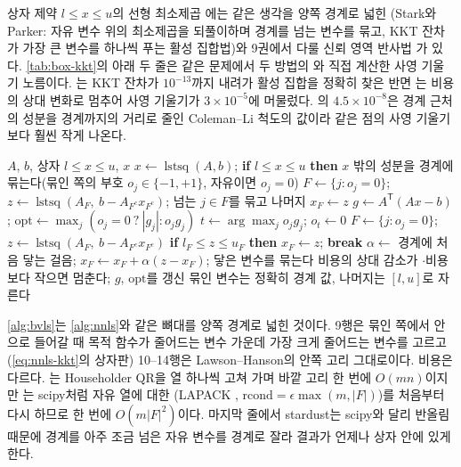 상자 제약 $l\le x\le u$의 선형 최소제곱 에는 같은 생각을 양쪽 경계로 넓힌 (Stark와 Parker\cite{stark1995}: 자유 변수 위의 최소제곱을 되풀이하며 경계를 넘는 변수를 묶고, KKT 잔차가 가장 큰 변수를 하나씩 푸는 활성 집합법)와 9권에서 다룰 신뢰 영역 반사법 가 있다. \cref{tab:box-kkt}의 아래 두 줄은 같은 문제에서 두 방법의 와 직접 계산한 사영 기울기 노름이다. 는 KKT 잔차가 $10^{-13}$까지 내려가 활성 집합을 정확히 찾은 반면 는 비용의 상대 변화로 멈추어 사영 기울기가 $3\times10^{-5}$에 머물렀다. 의  $4.5\times10^{-8}$은 경계 근처의 성분을 경계까지의 거리로 줄인 Coleman--Li 척도의 값이라 같은 점의 사영 기울기보다 훨씬 작게 나온다.

\begin{algorithm}[htbp]
\begin{algorithmic}[1]
\Require $A$, $b$, 상자 $l\le x\le u$, 
\Ensure $x$
\State $x\gets\operatorname{lstsq}(A,b)$; \textbf{if} $l\le x\le u$ \textbf{then} \Return $x$ 
\State 밖의 성분을 경계에 묶는다(묶인 쪽의 부호 $o_j\in\{-1,+1\}$, 자유이면 $o_j=0$)
\Repeat {}
  \State $F\gets\{j:o_j=0\}$; $z\gets\operatorname{lstsq}(A_F,\ b-A_{F^c}x_{F^c})$; 넘는 $j\in F$를 묶고 나머지 $x_F\gets z$
\State $g\gets A^{\mathsf T}(Ax-b)$; $\mathrm{opt}\gets\max_j(o_j=0\ ?\ |g_j|:o_jg_j)$
  \State $t\gets\arg\max_jo_jg_j$; $o_t\gets0$ 
  \Loop
    \State $F\gets\{j:o_j=0\}$; $z\gets\operatorname{lstsq}(A_F,\ b-A_{F^c}x_{F^c})$
    \State \textbf{if} $l_F\le z\le u_F$ \textbf{then} $x_F\gets z$; \textbf{break}
    \State $\alpha\gets$ 경계에 처음 닿는 걸음; $x_F\gets x_F+\alpha(z-x_F)$; 닿은 변수를 묶는다
  \EndLoop
  \State 비용의 상대 감소가 $\cdot$비용보다 작으면 멈춘다; $g$, $\mathrm{opt}$를 갱신
\EndWhile
\State 묶인 변수는 정확히 경계 값, 나머지는 $[l,u]$로 자른다
\end{algorithmic}
\caption{경계가 있는 최소제곱 BVLS (stardust 의 )}
\label{alg:bvls}
\end{algorithm}

\cref{alg:bvls}는 \cref{alg:nnls}와 같은 뼈대를 양쪽 경계로 넓힌 것이다. 9행은 묶인 쪽에서 안으로 들어갈 때 목적 함수가 줄어드는 변수 가운데 가장 크게 줄어드는 변수를 고르고(\cref{eq:nnls-kkt}의 상자판) 10--14행은 Lawson--Hanson의 안쪽 고리 그대로이다. 비용은 다르다. 는 Householder QR을 열 하나씩 고쳐 가며 바깥 고리 한 번에 $O(mn)$이지만 는 scipy처럼 자유 열에 대한 (LAPACK , $\mathrm{rcond}=\epsilon\max(m,|F|)$)를 처음부터 다시 하므로 한 번에 $O(m|F|^2)$이다. 마지막 줄에서 stardust는 scipy와 달리 반올림 때문에 경계를 아주 조금 넘은 자유 변수를 경계로 잘라 결과가 언제나 상자 안에 있게 한다.


